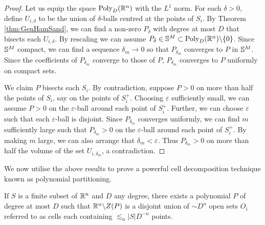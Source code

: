 \begin{proof}
    Let us equip the space $\operatorname{Poly}_D (\mathbb R^n)$ with the $L^1$ norm.
    For each $\delta>0$, define $U_{i, \delta}$ to be the union of $\delta$-balls centred at the points of $S_i$. 
    By Theorem \ref{thm:GenHamSand}, we can find a non-zero $P_{\delta}$ with degree at most $D$ that bisects each $U_{i, \delta}$. 
    By rescaling we can assume $P_{\delta} \in \mathbb S^M \subset \text{Poly}_D (\mathbb R^n) \backslash \{0\}$.
    Since $\mathbb S^M$ compact, we can find a sequence $\delta_m \to 0$ so that $P_{\delta_{m}}$ converges to $P$ in $\mathbb S^M$.
    Since the coefficients of $P_{\delta_{m}}$ converge to those of $P$, $P_{\delta_{m}}$ converges to $P$ uniformly on compact sets.

    We claim $P$ bisects each $S_i$. 
    By contradiction, suppose $P>0$ on more than half the points of $S_i$, say on the points of $S_i^+$. 
    Choosing $\varepsilon$ sufficiently small, we can assume $P>0$ on the $\varepsilon$-ball around each point of $S_i^+$.
    Further, we can choose $\varepsilon$ such that each $\varepsilon$-ball is disjoint. 
    Since $P_{\delta_{m}}$ converges uniformly, we can find $m$ sufficiently large such that $P_{\delta_{m}}>0$ 
    on the $\varepsilon$-ball around each point of $S_i^+$.
    By making $m$ large, we can also arrange that $\delta_m < \varepsilon$.
    Thus $P_{\delta_{m}} > 0$ on more than half the volume of the set $U_{i, \delta_{m}}$, a contradiction. 
\end{proof}
We now utilise the above results to prove a powerful cell decomposition technique known as polynomial partitioning.
\begin{theorem}
    If $S$ is a finite subset of $\mathbb R^n$ and $D$ any degree, there exists
    a polynomial $P$ of degree at most $D$ such that $\mathbb R^n \backslash Z(P)$ is a disjoint union of $\sim D^n$ open sets $O_i$ referred to as cells each containing
    $\lesssim_n |S|D^{-n}$ points. \label{thm:PolyPartioning}
 \end{theorem}
 
